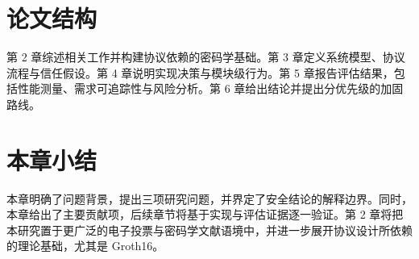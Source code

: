 \section{论文结构}

第 2 章综述相关工作并构建协议依赖的密码学基础。第 3 章定义系统模型、协议流程与信任假设。第 4 章说明实现决策与模块级行为。第 5 章报告评估结果，包括性能测量、需求可追踪性与风险分析。第 6 章给出结论并提出分优先级的加固路线。

\section{本章小结}

本章明确了问题背景，提出三项研究问题，并界定了安全结论的解释边界。同时，本章给出了主要贡献项，后续章节将基于实现与评估证据逐一验证。第 2 章将把本研究置于更广泛的电子投票与密码学文献语境中，并进一步展开协议设计所依赖的理论基础，尤其是 Groth16。

\endgroup
